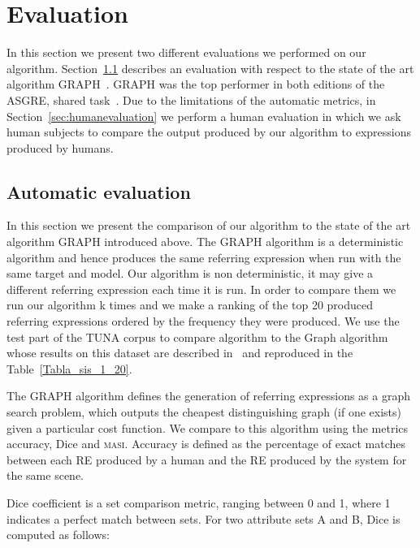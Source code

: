\section{Evaluation} \label{sec:evaluation}

In this section we present two different evaluations we performed on our algorithm. Section~\ref{sec:automaticevaluation} describes an evaluation with respect to the state of the art algorithm GRAPH~\cite{KrahmerGRAPH}. GRAPH was the top performer in both editions of the ASGRE, shared task~\cite{gatt-balz-kow:2008:ENLG}. Due to the limitations of the automatic metrics, in Section~\ref{sec:humanevaluation} we perform a human evaluation in  which we ask human subjects to compare the output produced by our algorithm to expressions produced by humans. 
  

\subsection{Automatic evaluation} \label{sec:automaticevaluation}

In this section we present the comparison of our algorithm to the state of the art algorithm GRAPH introduced above. The GRAPH algorithm is a deterministic algorithm and hence produces the same referring expression when run with the same target and model. Our algorithm is non deterministic, it may give a different referring expression each time it is run. In order to compare them we run our algorithm k times and we make a ranking of the top 20 produced referring expressions ordered by the frequency they were produced. We use the test part of the TUNA corpus to compare algorithm to the Graph algorithm whose results on this dataset are described in~\cite{KrahmerGRAPH} and reproduced in the Table~\ref{Tabla_sis_1_20}. 

The GRAPH algorithm defines the generation of referring expressions as a graph search problem, which outputs the cheapest distinguishing graph (if one exists) given a particular cost function. We compare to this algorithm using the metrics accuracy, Dice and \textsc{masi}. Accuracy is defined as the percentage of exact matches between each RE produced by a human and the RE produced by the system for the same scene. 

Dice coefficient is a set comparison metric, ranging between 0 and 1, where
1 indicates a perfect match between sets. For two
attribute sets A and B, Dice is computed as follows:\\

